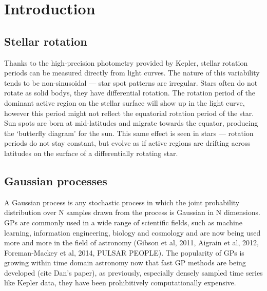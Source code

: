 \documentclass[10pt,preprint]{aastex}
\begin{document}
\section{Introduction}

\subsection{Stellar rotation}

Thanks to the high-precision photometry provided by Kepler, stellar rotation periods can be measured directly from light curves.
The nature of this variability tends to be non-sinusoidal --- star spot patterns are irregular.
Stars often do not rotate as solid bodys, they have differential rotation.
The rotation period of the dominant active region on the stellar surface will show up in the light curve, however this period might not reflect the equatorial rotation period of the star.
Sun spots are born at mid-latitudes and migrate towards the equator, producing the `butterfly diagram' for the sun.
This same effect is seen in stars --- rotation periods do not stay constant, but evolve as if active regions are drifting across latitudes on the surface of a differentially rotating star.

\subsection{Gaussian processes}

A Gaussian process is any stochastic process in which the joint probability distribution over N samples drawn from the process is Gaussian in N dimensions.
GPs are commonly used in a wide range of scientific fields, such as machine learning, information engineering, biology and cosmology and are now being used more and more in the field of astronomy (Gibson et al, 2011, Aigrain et al, 2012, Foreman-Mackey et al, 2014, PULSAR PEOPLE).
The popularity of GPs is growing within time domain astronomy now that fast GP methods are being developed (cite Dan's paper), as previously, especially densely sampled time series like Kepler data, they have been prohibitively computationally expensive.
\end{document}
